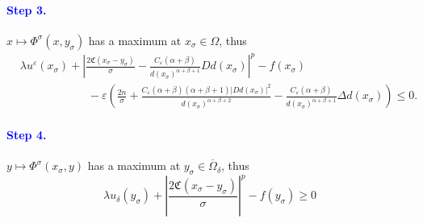 \documentclass[11pt,reqno]{amsart}
\numberwithin{figure}{section}
\theoremstyle{plain}
\theoremstyle{remark}
\numberwithin{equation}{section}
\begin{document}
\paragraph{\textcolor{blue}{\textbf{Step 3.}}} $x\mapsto \Phi^\sigma(x,y_\sigma)$ has a maximum at $x_\sigma\in \Omega$, thus 
\begin{align*}
    &\lambda u^\varepsilon(x_\sigma) + \left|\frac{2\mathfrak{C}(x_\sigma-y_\sigma)}{\sigma} - \frac{C_\varepsilon(\alpha+\beta)}{d(x_\sigma)^{\alpha+\beta+1}}D d(x_\sigma )\right|^p - f(x_\sigma)\\
    &\qquad\qquad\qquad -\varepsilon\left(\frac{2n}{\sigma} + \frac{C_\varepsilon(\alpha+\beta)(\alpha+\beta+1)|D d(x_\sigma)|^2}{d(x_\sigma)^{\alpha+\beta+2}}-\frac{C_\varepsilon(\alpha+\beta)}{d(x_\sigma)^{\alpha+\beta+1}}\Delta d(x_\sigma)\right)  \leq 0.
\end{align*}
\paragraph{\textcolor{blue}{\textbf{Step 4.}}} $y\mapsto \Phi^\sigma(x_\sigma,y)$ has a maximum at $y_\sigma\in \overline{\Omega}_\delta$, thus 
\begin{equation*}
    \lambda u_\delta(y_\sigma) + \left|\frac{2\mathfrak{C}(x_\sigma-y_\sigma)}{\sigma}\right|^p - f(y_\sigma) \geq 0
\end{equation*}
\end{document}
